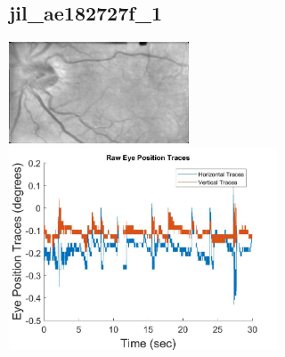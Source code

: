 \documentclass[11pt]{article}
\begin{document}
\subsection{jil\_ae182727f\_1}
\includegraphics[width=0.40\textwidth, valign=m]{referenceframes/rodenstock_amblyopes/jil_ae182727f_1_dwt_nostim_gamscaled_bandfilt_refframe.jpg}
\includegraphics[width=0.60\textwidth, valign=m]{eyepositiontraces/rodenstock_amblyopes/jil_ae182727f_1.jpg}\\
\end{document}
